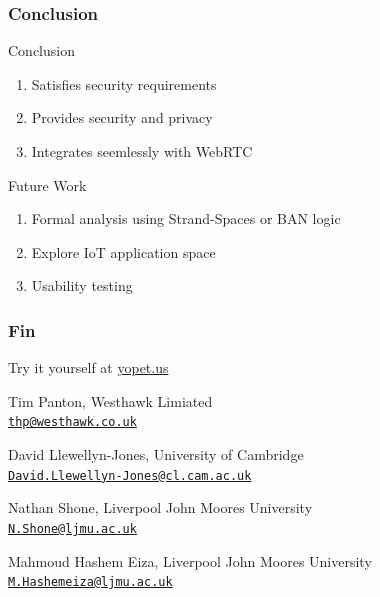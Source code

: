\documentclass[handout, notes=hide]{beamer}
\newcommand{\emaillink}[1]{\href{mailto:#1}{\nolinkurl{#1}}}
\begin{document}

\begin{frame}
\frametitle{Conclusion}
\setlength{\parskip}{0.5em}

Conclusion
\begin{enumerate}
\item Satisfies security requirements
\item Provides security and privacy
\item Integrates seemlessly with WebRTC
\end{enumerate}

Future Work
\begin{enumerate}
\item Formal analysis using Strand-Spaces or BAN logic
\item Explore IoT application space
\item Usability testing
\end{enumerate}

\end{frame}


\begin{frame}
\frametitle{Fin}
Try it yourself at \url{yopet.us}
\setlength{\parskip}{1.0em}

Tim Panton, Westhawk Limiated \\
\emaillink{thp@westhawk.co.uk}

David Llewellyn-Jones, University of Cambridge \\
\emaillink{David.Llewellyn-Jones@cl.cam.ac.uk}

Nathan Shone, Liverpool John Moores University \\
\emaillink{N.Shone@ljmu.ac.uk}

Mahmoud Hashem Eiza, Liverpool John Moores University \\
\emaillink{M.Hashemeiza@ljmu.ac.uk}

\end{frame}


%
%

\end{document}
